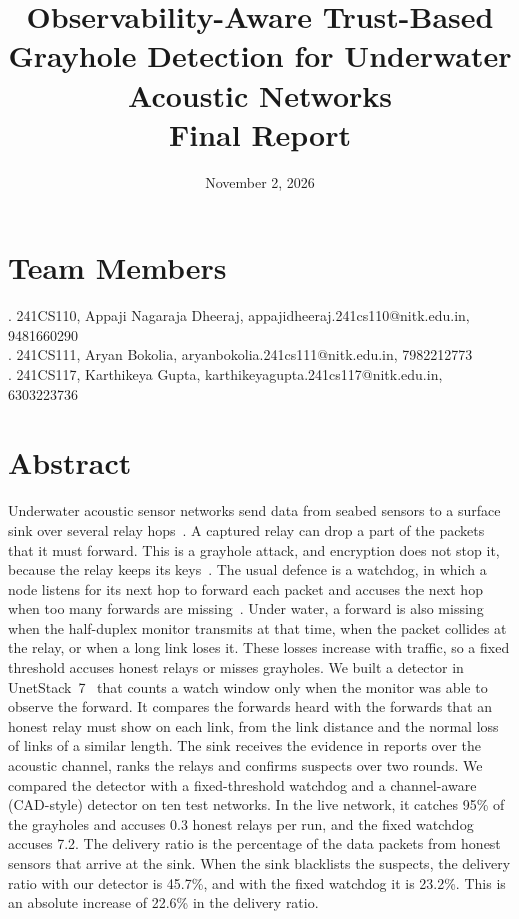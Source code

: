 \documentclass[11pt]{article}
\title{\textbf{Observability-Aware Trust-Based Grayhole Detection for Underwater Acoustic Networks}\\[4pt]
\large Final Report}
\date{November 2, 2026}
\begin{document}
\maketitle

\section*{Team Members}
. 241CS110, Appaji Nagaraja Dheeraj, appajidheeraj.241cs110@nitk.edu.in, 9481660290 \\
. 241CS111, Aryan Bokolia, aryanbokolia.241cs111@nitk.edu.in, 7982212773 \\
. 241CS117, Karthikeya Gupta, karthikeyagupta.241cs117@nitk.edu.in, 6303223736

\section*{Abstract}
\noindent
Underwater acoustic sensor networks send data from seabed sensors to a surface sink over several relay hops~\cite{akyildiz2005}.
A captured relay can drop a part of the packets that it must forward.
This is a grayhole attack, and encryption does not stop it, because the relay keeps its keys~\cite{karlof2003,domingo2011}.
The usual defence is a watchdog, in which a node listens for its next hop to forward each packet and accuses the next hop when too many forwards are missing~\cite{marti2000}.
Under water, a forward is also missing when the half-duplex monitor transmits at that time, when the packet collides at the relay, or when a long link loses it.
These losses increase with traffic, so a fixed threshold accuses honest relays or misses grayholes.
We built a detector in UnetStack~7~\cite{chitre2014} that counts a watch window only when the monitor was able to observe the forward.
It compares the forwards heard with the forwards that an honest relay must show on each link, from the link distance and the normal loss of links of a similar length.
The sink receives the evidence in reports over the acoustic channel, ranks the relays and confirms suspects over two rounds.
We compared the detector with a fixed-threshold watchdog and a channel-aware (CAD-style) detector on ten test networks.
In the live network, it catches 95\% of the grayholes and accuses 0.3 honest relays per run, and the fixed watchdog accuses 7.2.
The delivery ratio is the percentage of the data packets from honest sensors that arrive at the sink.
When the sink blacklists the suspects, the delivery ratio with our detector is 45.7\%, and with the fixed watchdog it is 23.2\%.
This is an absolute increase of 22.6\% in the delivery ratio.
\end{document}
